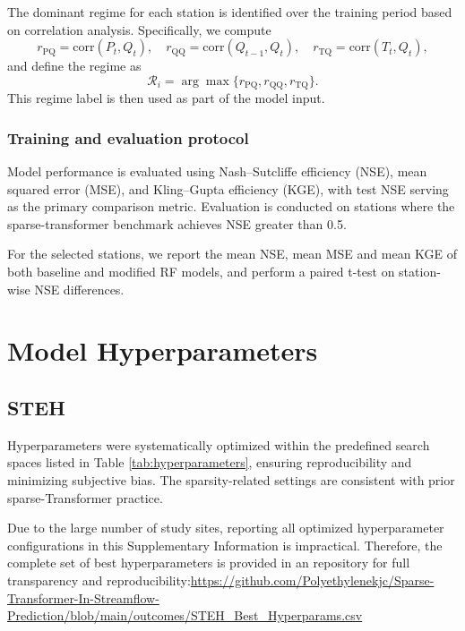 \documentclass[11pt]{article}
\begin{document}
The dominant regime for each station is identified over the training period based on correlation analysis\cite{Wrr_p_q}. Specifically, we compute
\begin{equation}
    r_{\mathrm{PQ}} = \mathrm{corr}(P_t, Q_t),
    \quad
    r_{\mathrm{QQ}} = \mathrm{corr}(Q_{t-1}, Q_t),
    \quad
    r_{\mathrm{TQ}} = \mathrm{corr}(T_t, Q_t),
\end{equation}
and define the regime as
\begin{equation}
    \mathcal{R}_i = \arg\max\{r_{\mathrm{PQ}}, r_{\mathrm{QQ}}, r_{\mathrm{TQ}}\}.
\end{equation}
This regime label is then used as part of the model input.

\subsubsection*{Training and evaluation protocol}

Model performance is evaluated using Nash--Sutcliffe efficiency (NSE), mean squared error (MSE), and Kling--Gupta efficiency (KGE), with test NSE serving as the primary comparison metric\cite{Nse}. Evaluation is conducted on stations where the sparse-transformer benchmark achieves NSE greater than 0.5\cite{WRR_NSE}.

For the selected stations, we report the mean NSE, mean MSE and mean KGE of both baseline and modified RF models, and perform a paired t-test on station-wise NSE differences.

\section{Model Hyperparameters}
\subsection{STEH}

Hyperparameters were systematically optimized within the predefined search spaces listed in Table \ref{tab:hyperparameters}\cite{BO_OPT}, ensuring reproducibility and minimizing subjective bias. The sparsity-related settings are consistent with prior sparse-Transformer practice\cite{openai_weight_sparse_transformers}.

Due to the large number of study sites, reporting all optimized hyperparameter configurations in this Supplementary Information is impractical. Therefore, the complete set of best hyperparameters is provided in an repository for full transparency and reproducibility:\href{https://github.com/Polyethylenekjc/Sparse-Transformer-In-Streamflow-Prediction/blob/main/outcomes/STEH\_Best\_Hyperparams.csv}{https://github.com/Polyethylenekjc/Sparse-Transformer-In-Streamflow-Prediction/blob/main/outcomes/STEH\_Best\_Hyperparams.csv}
\end{document}
